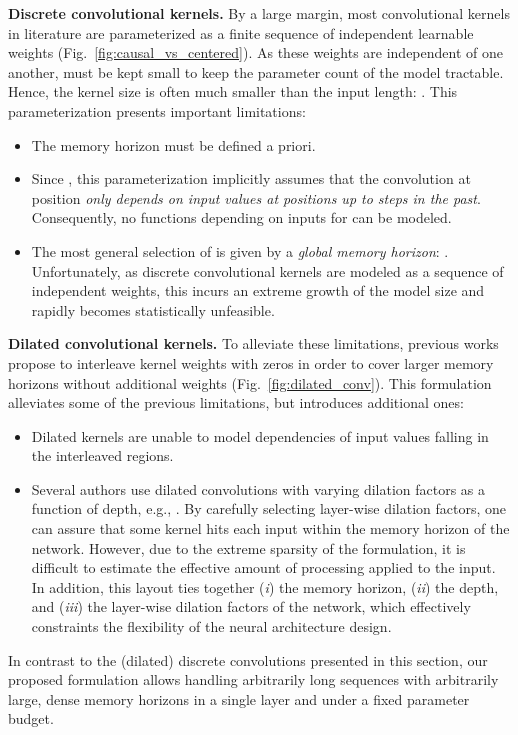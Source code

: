 \documentclass{article}
\begin{document}
\textbf{Discrete convolutional kernels.}
By a large margin, most convolutional kernels  in literature are parameterized as a finite sequence of  independent learnable weights  (Fig.~\ref{fig:causal_vs_centered}). As these weights are independent of one another,  must be kept small to keep the parameter count of the model tractable. Hence, the kernel size is often much smaller than the input length: . 
This parameterization presents important limitations:
\begin{itemize}[topsep=0pt, leftmargin=*]
\item The memory horizon  must be defined a priori.
\item Since , this parameterization implicitly assumes that the convolution  at position  \emph{only depends on input values at positions up to  steps in the past}. Consequently, no functions depending on inputs  for  can be modeled.
\item The most general selection of  is given by a \textit{global memory horizon}: . Unfortunately, as discrete convolutional kernels are modeled as a sequence of independent weights, this incurs an extreme growth of the model size and rapidly becomes statistically unfeasible.
\end{itemize}
\textbf{Dilated convolutional kernels.}
To alleviate these limitations, previous works propose to interleave kernel weights with zeros in order to cover larger memory horizons without additional weights (Fig.~\ref{fig:dilated_conv}). This formulation alleviates some of the previous limitations, but introduces additional ones:
\begin{itemize}[topsep=0pt, leftmargin=*]
\item Dilated kernels are unable to model dependencies of input values falling in the interleaved regions.\item Several authors use dilated convolutions with varying dilation factors as a function of depth, e.g., \citep{bai2018empirical, dai2017very, oord2016wavenet, romero2020wavelet}. By carefully selecting layer-wise dilation factors, one can assure that some kernel hits each input within the memory horizon of the network. However, due to the extreme sparsity of the formulation, it is difficult to estimate the effective amount of processing applied to the input. In addition, this layout ties together (\textit{i}) the memory horizon, (\textit{ii}) the depth, and (\textit{iii}) the layer-wise dilation factors of the network, which effectively constraints the flexibility of the neural architecture design.
\end{itemize}
In contrast to the (dilated) discrete convolutions presented in this section, our proposed formulation allows handling arbitrarily long sequences with arbitrarily large, dense memory horizons in a single layer and under a fixed parameter budget.
\vspace{-2mm}
\end{document}
